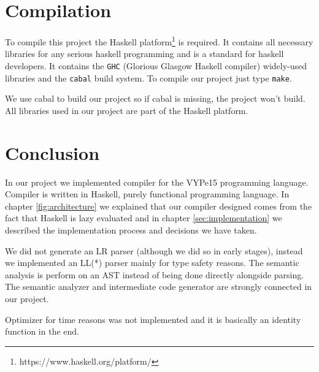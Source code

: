 \documentclass[titlepage]{article}
\begin{document}
\section{Compilation}
To compile this project the Haskell platform\footnote{https://www.haskell.org/platform/}
is required. It contains all necessary libraries for any serious haskell programming
and is a standard for haskell developers. It contains the \texttt{GHC} (Glorious Glasgow
Haskell compiler) widely-used libraries and the \texttt{cabal} build system.
To compile our project just type \texttt{make}.

We use cabal to build our project so if cabal is missing, the project won't build. 
All libraries used in our project are part of the Haskell platform.

\section{Conclusion}
In our project we implemented compiler for the VYPe15 programming language. Compiler
is written in Haskell, purely functional programming language. In chapter 
\ref{fig:architecture} we explained that our compiler designed comes from the fact
that Haskell is lazy evaluated and in chapter \ref{sec:implementation} we described the 
implementation process and decisions we have taken.

We did not generate an LR parser (although we did so in early stages), instead we
implemented an LL(*) parser mainly for type safety reasons. The semantic analysis is 
perform on an AST instead of being done directly alongside parsing. The semantic analyzer
and intermediate code generator are strongly connected in our project. 

Optimizer for time reasons was not implemented and it is basically an identity
function in the end. 

\newpage


\end{document}
